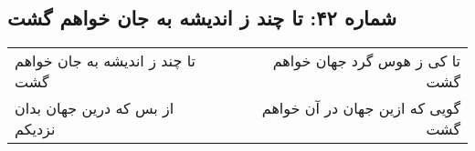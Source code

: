 \begin{center}
\section*{شماره ۴۲: تا چند ز اندیشه به جان خواهم گشت}
\label{sec:042}
\begin{longtable}{l p{0.5cm} r}
تا چند ز اندیشه به جان خواهم گشت
&&
تا کی ز هوس گرد جهان خواهم گشت
\\
از بس که درین جهان بدان نزدیکم
&&
گویی که ازین جهان در آن خواهم گشت
\\
\end{longtable}
\end{center}
